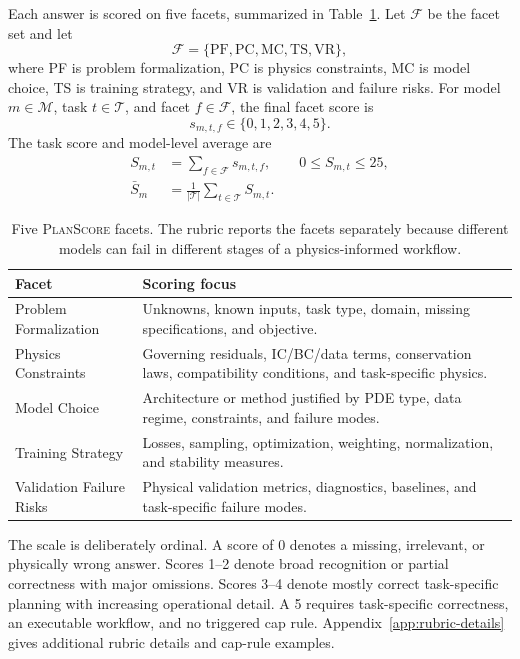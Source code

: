 \documentclass[11pt]{article}
\newcommand{\planscore}{\textsc{PlanScore}}
\newcommand{\facetset}{\mathcal{F}}
\newcommand{\taskset}{\mathcal{T}}
\newcommand{\modelset}{\mathcal{M}}
\begin{document}
Each answer is scored on five facets, summarized in Table~\ref{tab:facets}. Let $\facetset$ be the facet set and let
\[
\facetset = \{\mathrm{PF}, \mathrm{PC}, \mathrm{MC}, \mathrm{TS}, \mathrm{VR}\},
\]
where PF is problem formalization, PC is physics constraints, MC is model choice, TS is training strategy, and VR is validation and failure risks. For model $m \in \modelset$, task $t \in \taskset$, and facet $f \in \facetset$, the final facet score is
\[
s_{m,t,f} \in \{0,1,2,3,4,5\}.
\]
The task score and model-level average are
\begin{align}
S_{m,t} &= \sum_{f \in \facetset} s_{m,t,f}, \qquad 0 \le S_{m,t} \le 25, \\
\bar{S}_{m} &= \frac{1}{|\taskset|}\sum_{t \in \taskset} S_{m,t}.
\end{align}

\begin{table}[t]
\caption{Five \planscore{} facets. The rubric reports the facets separately because different models can fail in different stages of a physics-informed workflow.}
\label{tab:facets}
\centering
\small
\begin{tabularx}{\columnwidth}{p{}X}
\toprule
\textbf{Facet} & \textbf{Scoring focus} \\
\midrule
Problem Formalization & Unknowns, known inputs, task type, domain, missing specifications, and objective. \\
Physics Constraints & Governing residuals, IC/BC/data terms, conservation laws, compatibility conditions, and task-specific physics. \\
Model Choice & Architecture or method justified by PDE type, data regime, constraints, and failure modes. \\
Training Strategy & Losses, sampling, optimization, weighting, normalization, and stability measures. \\
Validation Failure Risks & Physical validation metrics, diagnostics, baselines, and task-specific failure modes. \\
\bottomrule
\end{tabularx}
\end{table}

The scale is deliberately ordinal. A score of 0 denotes a missing, irrelevant, or physically wrong answer. Scores 1--2 denote broad recognition or partial correctness with major omissions. Scores 3--4 denote mostly correct task-specific planning with increasing operational detail. A 5 requires task-specific correctness, an executable workflow, and no triggered cap rule. Appendix~\ref{app:rubric-details} gives additional rubric details and cap-rule examples.
\end{document}
